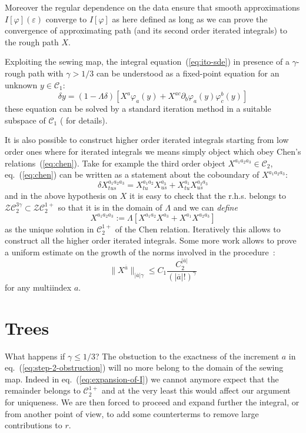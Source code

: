 \documentclass[a4paper]{article}
\newcommand{\1}{{\bf 1}}
\newcommand{\eps}{\varepsilon}
\newcommand{\der}{\delta}
\newcommand{\CC}{\mathcal{C}}
\newcommand{\ZZ}{\mathcal{Z}}
\newcommand{\ZCC}{\ZZ\CC}
\newcommand{\CC}{\mathcal{C}}
\newcommand{\eps}{\varepsilon}
\newcommand{\der}{\delta}
\begin{document}
Moreover the regular dependence on the data ensure that smooth approximations
 $I[\varphi](\eps)$ converge to $I[\varphi]$ as here defined as long
 as we can prove the convergence of approximating path (and its second
 order iterated integrals) to the rough path $X$.

Exploiting the sewing map, the integral equation~(\ref{eq:ito-sde}) in presence of a
$\gamma$-rough path with $\gamma > 1/3$ can be
understood as a fixed-point equation for an unknown $y \in \CC_1$:
$$
\der y = (1-\Lambda \der)[ X^a \varphi_a(y) + 
 X^{a c} \partial_b \varphi_a(y) \varphi^b_{c}(y) ]
$$
these equation can be solved by a standard iteration method in a
suitable subspace of $\CC_1$ (\cite{MR2091358} for details).

It is also possible to construct higher order
iterated integrals starting from low order ones where for iterated
integrals we means simply object which obey Chen's
relations~(\ref{eq:chen}). Take for example the third order object
$X^{a_1 a_2 a_3} \in \CC_2$, eq.~(\ref{eq:chen}) can be
written as a statement about the coboundary of $X^{a_1 a_2 a_3}$:
$$
\der X^{a_1 a_2 a_3}_{tus} = X^{a_1 a_2
  }_{tu} X^{a_3}_{us} + X^{a_1}_{tu} X^{ a_2 a_3}_{us} 
$$
and in the above hypothesis on $X$ it is easy to check that the
r.h.s. belongs to $\ZCC_2^{3\gamma} \subset \ZZ\CC_2^{1+}$ so that it is in the domain of
$\Lambda$ and we can \emph{define}
$$
X^{a_1 a_2 a_3} := \Lambda[X^{a_1 a_2
  } X^{a_3} + X^{a_1} X^{ a_2 a_3}] 
$$
as the unique solution in $\CC_2^{1+}$ of the Chen
relation. Iteratively this allows to construct all the higher order
iterated integrals. Some more work allows to prove a  uniform estimate
on the growth of the norms involved in the procedure~\cite{MR1654527,MR2091358}:
\begin{equation}
\label{eq:growth-lin}
\|X^{\overline a}\|_{|\overline a|\gamma} \le C_1
\frac{C_2^{|\overline a|}}{(|\overline a|!)^{\gamma}}
\end{equation}
for any multiindex $a$. 

\section{Trees}
\label{sec:trees}

What happens if $\gamma \le 1/3$? The obstuction to the exactness of
the increment $a$ in eq.~(\ref{eq:step-2-obstruction}) will no more
belong to the domain of the sewing map. Indeed in
eq.~(\ref{eq:expansion-of-I}) we cannot anymore expect that the
remainder belongs to $\CC^{1+}_2$ and at the very least this would
affect our argument for uniqueness. We are then forced to proceed and
expand further the integral, or from another point of view, to add
some counterterms to remove large contributions to $r$. 
\end{document}
